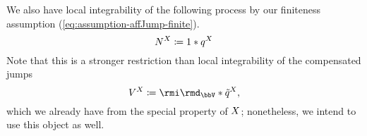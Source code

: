 We also have local integrability of the following process by our finiteness assumption (\ref{eq:assumption-affJump-finite}).
\begin{equation}
  \label{eq:arrivals}
  N^X \coloneqq 1 \ast q^X
\end{equation}
Note that this is a stronger restriction than local integrability of the compensated jumps
\begin{equation}
  \label{eq:jumps}
  \V^\X \defeq \id_\vecSpace \ast \compensate{\jumpMeas^\X},
\end{equation}
which we already have from the special property of $X$; nonetheless, we intend to use this object as well.


